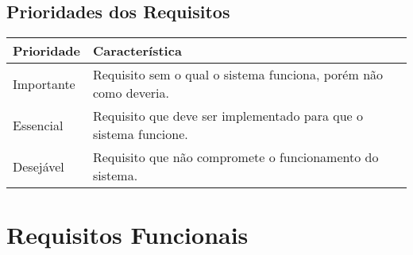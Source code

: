 \documentclass{article}
\begin{document}
  \subsection{Prioridades dos Requisitos}
    \FloatBarrier
    \begin{table}[H]
      \begin{center}
        \begin{tabular}[pos]{|m{2cm} | m{12cm}|}
          \hline
          \cellcolor[gray]{0.9}\textbf{Prioridade} & \cellcolor[gray]{0.9}\textbf{Característica} \\ \hline
          Importante      & Requisito sem o qual o sistema funciona, porém não como deveria.  \\ \hline
          Essencial       & Requisito que deve ser implementado para que o sistema funcione.  \\ \hline
          Desejável       & Requisito que não compromete o funcionamento do sistema.  \\ \hline
        \end{tabular}
      \end{center}
    \end{table}

  \section{Requisitos Funcionais}
\end{document}
